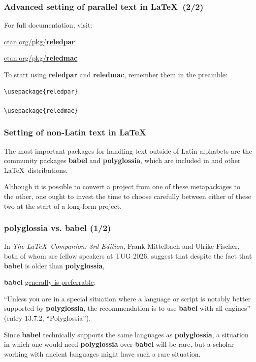 \documentclass[aspectratio=169]{beamer}
\begin{document}
\begin{frame}[fragile]
	\frametitle[Advanced Parallel Text]{Advanced setting of parallel text in \LaTeX\  {\scriptsize (2/2)}}

For full documentation, visit: \break

\href{https://ctan.org/pkg/reledpar}{ctan.org/pkg/\textbf{reledpar}} \break

\href{https://ctan.org/pkg/reledmac}{ctan.org/pkg/\textbf{reledmac}} \break
	
To start using \textbf{reledpar} and \textbf{reledmac}, remember them in the preamble: \break

\begin{lstlisting}
\usepackage{reledpar}

\usepackage{reledmac}
\end{lstlisting}
	
\end{frame}

\begin{frame}[fragile]
	\frametitle[Non-Latin Text]{Setting of non-Latin text in \LaTeX}

The most important packages for handling text outside of Latin alphabets are the community packages \textbf{babel} and \textbf{polyglossia}, which are included in  and other \LaTeX\ distributions. \break

Although it is possible to convert a project from one of these metapackages to the other, one ought to invest the time to choose carefully between either of these two at the start of a long-form project.
\end{frame}

\begin{frame}[fragile]
	\frametitle[Polyglossia vs. Babel]{polyglossia vs. babel {\scriptsize (1/2)}}
	
In \textit{The \LaTeX\ Companion: 3rd Edition}, Frank Mittelbach and Ulrike Fischer, both of whom are fellow speakers at TUG 2026, suggest that despite the fact that \textbf{babel} is older than \textbf{polyglossia}, \break 

\textbf{babel} \underline{generally is preferrable}: \break

 ``Unless you are in a special situation where a language or script is notably better supported by \textbf{polyglossia}, the recommendation is to use \textbf{babel} with all engines'' (entry 13.7.2, ``Polyglossia''). \break

Since \textbf{babel} technically supports the same languages as \textbf{polyglossia}, a situation in which one would need \textbf{polyglossia} over \textbf{babel} will be rare, but a scholar working with ancient languages might have such a rare situation. \break
\end{frame}
\end{document}
